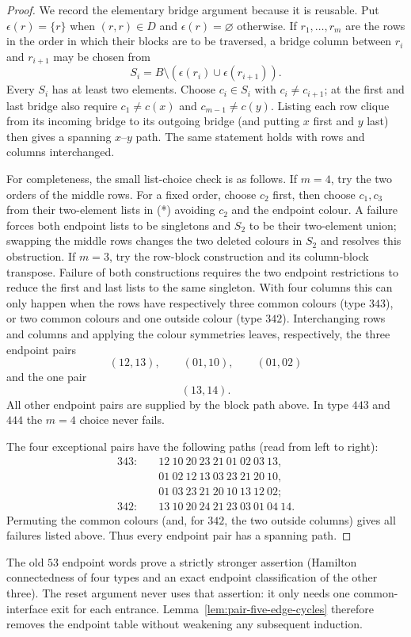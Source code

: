 \begin{proof}
We record the elementary bridge argument because it is reusable.  Put
$\epsilon(r)=\{r\}$ when $(r,r)\in D$ and $\epsilon(r)=\varnothing$
otherwise.  If $r_1,\ldots,r_m$ are the rows in the order in which their
blocks are to be traversed, a bridge column between $r_i$ and $r_{i+1}$ may
be chosen from
\[
 S_i=B\setminus(\epsilon(r_i)\cup\epsilon(r_{i+1})).                 \tag{*}
\]
Every $S_i$ has at least two elements.  Choose $c_i\in S_i$ with
$c_i\ne c_{i+1}$; at the first and last bridge also require
$c_1\ne c(x)$ and $c_{m-1}\ne c(y)$.  Listing each row clique from its
incoming bridge to its outgoing bridge (and putting $x$ first and $y$ last)
then gives a spanning $x$--$y$ path.  The same statement holds with rows and
columns interchanged.

For completeness, the small list-choice check is as follows.  If $m=4$, try
the two orders of the middle rows.  For a fixed order, choose $c_2$ first,
then choose $c_1,c_3$ from their two-element lists in (*) avoiding $c_2$ and
the endpoint colour.  A failure forces both endpoint lists to be singletons
and $S_2$ to be their two-element union; swapping the middle rows changes
the two deleted colours in $S_2$ and resolves this obstruction.  If $m=3$,
try the row-block construction and its
column-block transpose.  Failure of both constructions requires the two
endpoint restrictions to reduce the
first and last lists to the same singleton.  With four columns this can only
happen when the rows have respectively three common colours (type $343$), or
two common colours and one outside colour (type $342$).  Interchanging rows
and columns and applying the colour symmetries leaves, respectively, the
three endpoint pairs
\[
 (12,13),\qquad(01,10),\qquad(01,02)                       \tag{343}
\]
and the one pair
\[
 (13,14) .                                                   \tag{342}
\]
All other endpoint pairs are supplied by the block path above.  In type
$443$ and $444$ the $m=4$ choice never fails.

The four exceptional pairs have the following paths (read from left to
right):
\[
\begin{aligned}
343:&\quad 12\ 10\ 20\ 23\ 21\ 01\ 02\ 03\ 13,\\
    &\quad 01\ 02\ 12\ 13\ 03\ 23\ 21\ 20\ 10,\\
    &\quad 01\ 03\ 23\ 21\ 20\ 10\ 13\ 12\ 02;\\
342:&\quad 13\ 10\ 20\ 24\ 21\ 23\ 03\ 01\ 04\ 14.
\end{aligned}
\]
Permuting the common colours (and, for $342$, the two outside columns) gives
all failures listed above.  Thus every endpoint pair has a spanning path.
\end{proof}

\begin{remark}
The old $53$ endpoint words prove a strictly stronger assertion (Hamilton
connectedness of four types and an exact endpoint classification of the other
three).  The reset argument never uses that assertion: it only needs one
common-interface exit for each entrance.  Lemma~\ref{lem:pair-five-edge-cycles}
therefore removes the endpoint table without weakening any subsequent
induction.
\end{remark}
